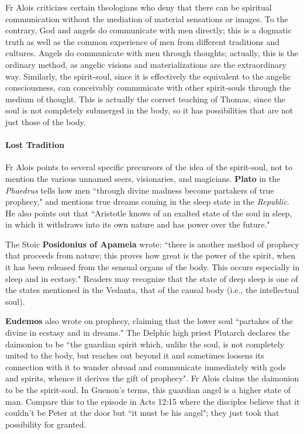 Fr Alois criticizes certain theologians who deny that there can be spiritual communication without the mediation of material sensations or images. To the contrary, God and angels do communicate with men directly; this is a dogmatic truth as well as the common experience of men from different traditions and cultures. Angels do communicate with men through thoughts; actually, this is the ordinary method, as angelic visions and materializations are the extraordinary way. Similarly, the spirit-soul, since it is effectively the equivalent to the angelic consciousness, can conceivably communicate with other spirit-souls through the medium of thought. This is actually the correct teaching of Thomas, since the soul is not completely submerged in the body, so it has possibilities that are not just those of the body.

\paragraph{Lost Tradition}
Fr Alois points to several specific precursors of the idea of the spirit-soul, not to mention the various unnamed seers, visionaries, and magicians. \textbf{Plato} in the \emph{Phaedrus} tells how men ``through divine madness become partakers of true prophecy," and mentions true dreams coming in the sleep state in the \emph{Republic}. He also points out that ``Aristotle knows of an exalted state of the soul in sleep, in which it withdraws into its own nature and has power over the future."

The Stoic \textbf{Posidonius of Apameia} wrote: ``there is another method of prophecy that proceeds from nature; this proves how great is the power of the spirit, when it has been released from the sensual organs of the body. This occurs especially in sleep and in ecstasy." Readers may recognize that the state of deep sleep is one of the states mentioned in the Vedanta, that of the causal body (i.e., the intellectual soul).

\textbf{Eudemos} also wrote on prophecy, claiming that the lower soul ``partakes of the divine in ecstasy and in dreams." The Delphic high priest Plutarch declares the daimonion to be ``the guardian spirit which, unlike the soul, is not completely united to the body, but reaches out beyond it and sometimes loosens its connection with it to wander abroad and communicate immediately with gods and spirits, whence it derives the gift of prophecy". Fr Alois claims the daimonion to be the spirit-soul. In Guenon's terms, this guardian angel is a higher state of man. Compare this to the episode in Acts 12:15 where the disciples believe that it couldn't be Peter at the door but ``it must be his angel"; they just took that possibility for granted.

